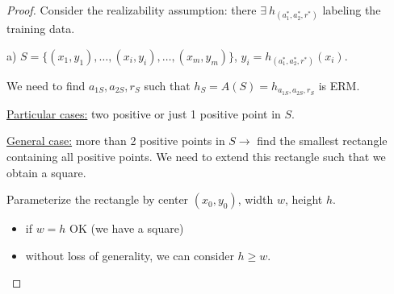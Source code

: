 \documentclass{article}
\newcommand{\<}{\langle}
\renewcommand{\>}{\rangle}
\theoremstyle{definition}
\newcommand{\hs}{h_S}
\newcommand{\hs}{h_S}
\begin{document}
\begin{proof}

Consider the realizability assumption: there $\exists \: h_{(a_1^*, a_2^*, r^*)}$
labeling the training data.

a) $S = \{(x_1, y_1), \dots, (x_i, y_i), \dots, (x_m, y_m)\}$,
$y_i = h_{(a_1^*, a_2^*, r^*)}(x_i)$.

We need to find $a_{1S}, a_{2S}, r_{S}$ such that
$\hs = A(S) = h_{a_{1S}, a_{2S}, r_{S}}$ is ERM.


\underline{Particular cases:} two positive or just 1 positive point in $S$.

\underline{General case:} more than 2 positive points in $S \rightarrow$
find the smallest rectangle containing all positive points. We need to extend
this rectangle such that we obtain a square.


Parameterize the rectangle by center $(x_0, y_0)$, width $w$, height $h$.
\begin{itemize}[label=-]
\item if $w = h$ \quad OK (we have a square)
\item without loss of generality, we can consider $h \geq w$.
\end{itemize}

\end{proof}
\end{document}
